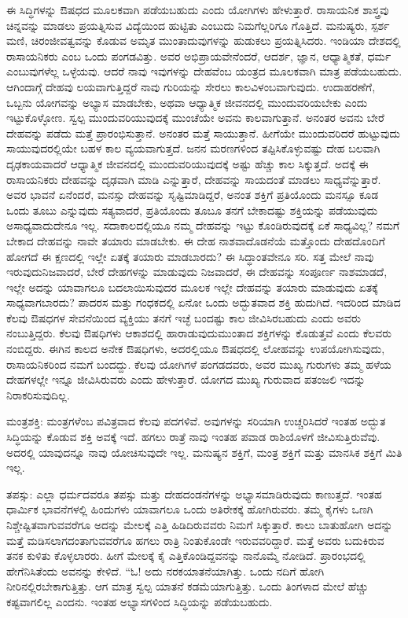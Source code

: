 ಈ ಸಿದ್ಧಿಗಳನ್ನು ಔಷಧದ ಮೂಲಕವಾಗಿ ಪಡೆಯಬಹುದು ಎಂದು ಯೋಗಿಗಳು ಹೇಳುತ್ತಾರೆ. ರಾಸಾಯನಿಕ ಶಾಸ್ತ್ರವು ಚಿನ್ನವನ್ನು ಮಾಡಲು ಪ್ರಯತ್ನಿಸುವ ವಿದ್ಯೆಯಿಂದ ಹುಟ್ಟಿತು ಎಂಬುದು ನಿಮಗೆಲ್ಲರಿಗೂ ಗೊತ್ತಿದೆ. ಮನುಷ್ಯರು, ಸ್ಪರ್ಶ ಮಣಿ, ಚಿರಂಜೀವತ್ವವನ್ನು ಕೊಡುವ ಅಮೃತ ಮುಂತಾದುವುಗಳನ್ನು ಹುಡುಕಲು ಪ್ರಯತ್ನಿಸಿದರು. ಇಂಡಿಯಾ ದೇಶದಲ್ಲಿ ರಾಸಾಯನಿಕರು ಎಂಬ ಒಂದು ಪಂಗಡವಿತ್ತು. ಅವರ ಅಭಿಪ್ರಾಯವೇನೆಂದರೆ, ಆದರ್ಶ, ಜ್ಞಾನ, ಆಧ್ಯಾತ್ಮಿಕತೆ, ಧರ್ಮ ಎಂಬುವುಗಳೆಲ್ಲ ಒಳ್ಳೆಯವು. ಆದರೆ ನಾವು ಇವುಗಳನ್ನು ದೇಹವೆಂಬ ಯಂತ್ರದ ಮೂಲಕವಾಗಿ ಮಾತ್ರ ಪಡೆಯಬಹುದು. ಆಗಿಂದಾಗ್ಗೆ ದೇಹವು ಲಯವಾಗುತ್ತಿದ್ದರೆ ನಾವು ಗುರಿಯನ್ನು ಸೇರಲು ಕಾಲವಿಳಂಬವಾಗುವುದು. ಉದಾಹರಣೆಗೆ, ಒಬ್ಬನು ಯೋಗವನ್ನು ಅಭ್ಯಾಸ ಮಾಡಬೇಕು, ಅಥವಾ ಆಧ್ಯಾತ್ಮಿಕ ಜೀವನದಲ್ಲಿ ಮುಂದುವರಿಯಬೇಕು ಎಂದು ಇಟ್ಟುಕೊಳ್ಳೋಣ. ಸ್ವಲ್ಪ ಮುಂದುವರಿಯುವುದಕ್ಕೆ ಮುಂಚೆಯೇ ಅವನು ಕಾಲವಾಗುತ್ತಾನೆ. ಅನಂತರ ಅವನು ಬೇರೆ ದೇಹವನ್ನು ಪಡೆದು ಮತ್ತೆ ಪ್ರಾರಂಭಿಸುತ್ತಾನೆ. ಅನಂತರ ಮತ್ತೆ ಸಾಯುತ್ತಾನೆ. ಹೀಗೆಯೇ ಮುಂದುವರಿದರೆ ಹುಟ್ಟುವುದು ಸಾಯುವುದರಲ್ಲಿಯೇ ಬಹಳ ಕಾಲ ವ್ಯಯವಾಗುತ್ತದೆ. ಜನನ ಮರಣಗಳಿಂದ ತಪ್ಪಿಸಿಕೊಳ್ಳುವಷ್ಟು ದೇಹ ಬಲವಾಗಿ ದೃಢಕಾಯವಾದರೆ ಆಧ್ಯಾತ್ಮಿಕ ಜೀವನದಲ್ಲಿ ಮುಂದುವರಿಯುವುದಕ್ಕೆ ಅಷ್ಟು ಹೆಚ್ಚು ಕಾಲ ಸಿಕ್ಕುತ್ತದೆ. ಅದಕ್ಕೆ ಈ ರಾಸಾಯನಿಕರು ದೇಹವನ್ನು ದೃಢವಾಗಿ ಮಾಡಿ ಎನ್ನುತ್ತಾರೆ, ದೇಹವನ್ನು ಸಾಯದಂತೆ ಮಾಡಲು ಸಾಧ್ಯವೆನ್ನುತ್ತಾರೆ. ಅವರ ಭಾವನೆ ಏನೆಂದರೆ, ಮನಸ್ಸು ದೇಹವನ್ನು ಸೃಷ್ಟಿಮಾಡಿದ್ದರೆ, ಅನಂತ ಶಕ್ತಿಗೆ ಪ್ರತಿಯೊಂದು ಮನಸ್ಸೂ ಕೂಡ ಒಂದು ತೂಬು ಎನ್ನುವುದು ಸತ್ಯವಾದರೆ, ಪ್ರತಿಯೊಂದು ತೂಬೂ ತನಗೆ ಬೇಕಾದಷ್ಟು ಶಕ್ತಿಯನ್ನು ಪಡೆಯುವುದು ಅಸಾಧ್ಯವಾದುದೇನೂ ಇಲ್ಲ. ಸದಾಕಾಲದಲ್ಲಿಯೂ ನಮ್ಮ ದೇಹವನ್ನು ಇಟ್ಟು ಕೊಂಡಿರುವುದಕ್ಕೆ ಏಕೆ ಸಾಧ್ಯವಿಲ್ಲ? ನಮಗೆ ಬೇಕಾದ ದೇಹವನ್ನು ನಾವೇ ತಯಾರು ಮಾಡಬೇಕು. ಈ ದೇಹ ನಾಶವಾದೊಡನೆಯೆ ಮತ್ತೊಂದು ದೇಹದೊಂದಿಗೆ ಹೋಗದೆ ಈ ಕ್ಷಣದಲ್ಲಿ ಇಲ್ಲೇ ಏತಕ್ಕೆ ತಯಾರು ಮಾಡಬಾರದು? ಈ ಸಿದ್ಧಾಂತವೇನೂ ಸರಿ. ಸತ್ತ ಮೇಲೆ ನಾವು ಇರುವುದು\break ನಿಜವಾದರೆ, ಬೇರೆ ದೇಹಗಳನ್ನು ಮಾಡುವುದು ನಿಜವಾದರೆ, ಈ ದೇಹವನ್ನು ಸಂಪೂರ್ಣ ನಾಶಮಾಡದೆ, ಇಲ್ಲೇ ಅದನ್ನು ಯಾವಾಗಲೂ ಬದಲಾಯಿಸುವುದರ ಮೂಲಕ ಇಲ್ಲೇ ದೇಹವನ್ನು ತಯಾರು ಮಾಡುವುದು ಏತಕ್ಕೆ ಸಾಧ್ಯವಾಗಬಾರದು? ಪಾದರಸ ಮತ್ತು ಗಂಧಕದಲ್ಲಿ ಏನೋ ಒಂದು ಅದ್ಭುತವಾದ ಶಕ್ತಿ ಹುದುಗಿದೆ. ಇದರಿಂದ ಮಾಡಿದ ಕೆಲವು ಔಷಧಗಳ ಸೇವನೆಯಿಂದ ವ್ಯಕ್ತಿಯು ತನಗೆ ಇಚ್ಛೆ ಬಂದಷ್ಟು ಕಾಲ ಜೀವಿಸಿರಬಹುದು ಎಂದು ಅವರು ನಂಬುತ್ತಿದ್ದರು. ಕೆಲವು ಔಷಧಿಗಳು ಆಕಾಶದಲ್ಲಿ ಹಾರಾಡುವುದು\break ಮುಂತಾದ ಶಕ್ತಿಗಳನ್ನು ಕೊಡುತ್ತವೆ ಎಂದು ಕೆಲವರು ನಂಬಿದ್ದರು. ಈಗಿನ ಕಾಲದ ಅನೇಕ ಔಷಧಿಗಳು, ಅದರಲ್ಲಿಯೂ ಔಷಧದಲ್ಲಿ ಲೋಹವನ್ನು ಉಪಯೋಗಿಸುವುದು, ರಾಸಾಯನಿಕರಿಂದ ನಮಗೆ ಬಂದದ್ದು. ಕೆಲವು ಯೋಗಿಗಳೆ ಪಂಗಡದವರು, ಅವರ ಮುಖ್ಯ ಗುರುಗಳು ತಮ್ಮ ಹಳೆಯ ದೇಹಗಳಲ್ಲೇ ಇನ್ನೂ ಜೀವಿಸಿರುವರು ಎಂದು ಹೇಳುತ್ತಾರೆ. ಯೋಗದ ಮುಖ್ಯ ಗುರುವಾದ ಪತಂಜಲಿ ಇದನ್ನು ನಿರಾಕರಿಸುವುದಿಲ್ಲ. 

ಮಂತ್ರಶಕ್ತಿ: ಮಂತ್ರಗಳೆಂಬ ಪವಿತ್ರವಾದ ಕೆಲವು ಪದಗಳಿವೆ. ಅವುಗಳನ್ನು ಸರಿಯಾಗಿ ಉಚ್ಚರಿಸಿದರೆ ಇಂತಹ ಅದ್ಭುತ ಸಿದ್ಧಿಯನ್ನು ಕೊಡುವ ಶಕ್ತಿ ಅವಕ್ಕೆ ಇದೆ. ಹಗಲು ರಾತ್ರೆ ನಾವು ಇಂತಹ ಪವಾಡ ರಾಶಿಯೊಳಗೆ ಜೀವಿಸುತ್ತಿರುವೆವು. ಅದರಲ್ಲಿ ಯಾವುದನ್ನೂ ನಾವು ಯೋಚಿಸುವುದೇ ಇಲ್ಲ. ಮನುಷ್ಯನ ಶಕ್ತಿಗೆ, ಮಂತ್ರ ಶಕ್ತಿಗೆ ಮತ್ತು ಮಾನಸಿಕ ಶಕ್ತಿಗೆ ಮಿತಿ ಇಲ್ಲ. 

ತಪಸ್ಸು: ಎಲ್ಲಾ ಧರ್ಮದವರೂ ತಪಸ್ಸು ಮತ್ತು ದೇಹದಂಡನೆಗಳನ್ನು ಅಭ್ಯಾಸಮಾಡಿರುವುದು ಕಾಣುತ್ತದೆ. ಇಂತಹ ಧಾರ್ಮಿಕ ಭಾವನೆಗಳಲ್ಲಿ ಹಿಂದುಗಳು ಯಾವಾಗಲೂ ಒಂದು ಅತಿರೇಕಕ್ಕೆ ಹೋಗಿರುವರು. ತಮ್ಮ ಕೈಗಳು ಒಣಗಿ ನಿಶ್ಚೇಷ್ಟಿತವಾಗುವವರೆಗೂ ಅದನ್ನು ಮೇಲಕ್ಕೆ ಎತ್ತಿ ಹಿಡಿದಿರುವವರು ನಿಮಗೆ ಸಿಕ್ಕುತ್ತಾರೆ. ಕಾಲು ಬಾತುಹೋಗಿ ಅದನ್ನು ಮತ್ತೆ ಮಡಿಸಲಾಗದಂತಾಗುವವರೆಗೂ ಹಗಲು ರಾತ್ರಿ ನಿಂತುಕೊಂಡೇ ಇರುವವರಿದ್ದಾರೆ. ಮತ್ತೆ ಅವರು ಬದುಕಿರುವ ತನಕ ಕುಳಿತು ಕೊಳ್ಳಲಾರರು. ಹೀಗೆ ಮೇಲಕ್ಕೆ ಕೈ ಎತ್ತಿಕೊಂಡಿದ್ದವನನ್ನು ನಾನೊಮ್ಮೆ ನೋಡಿದೆ. ಪ್ರಾರಂಭದಲ್ಲಿ ಹೇಗೆನಿಸಿತೆಂದು ಅವನನ್ನು ಕೇಳಿದೆ. “ಓ! ಅದು ನರಕಯಾತನೆಯಾಗಿತ್ತು. ಒಂದು ನದಿಗೆ ಹೋಗಿ ನೀರಿನಲ್ಲಿರಬೇಕಾಗುತ್ತಿತ್ತು. ಆಗ ಮಾತ್ರ ಸ್ವಲ್ಪ ಯಾತನೆ ಕಡಮೆಯಾಗುತ್ತಿತ್ತು. ಒಂದು ತಿಂಗಳಾದ ಮೇಲೆ ಹೆಚ್ಚು ಕಷ್ಟವಾಗಲಿಲ್ಲ ಎಂದನು. ಇಂತಹ ಅಭ್ಯಾಸಗಳಿಂದ ಸಿದ್ಧಿಯನ್ನು ಪಡೆಯಬಹುದು. 


